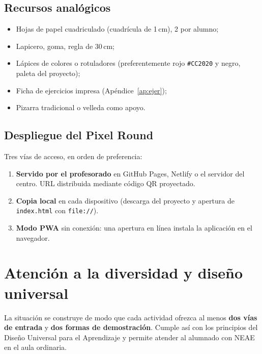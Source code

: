 \documentclass[12pt,a4paper]{scrartcl}
\newcommand{\acc}[1]{\textcolor{accent}{\textbf{#1}}}
\begin{document}
\subsection{Recursos analógicos}
\begin{itemize}[leftmargin=1.3em,itemsep=0.15em,topsep=0.3em]
  \item Hojas de papel cuadriculado (cuadrícula de 1\,cm), 2 por alumno;
  \item Lapicero, goma, regla de 30\,cm;
  \item Lápices de colores o rotuladores (preferentemente rojo \texttt{\#CC2020} y negro, paleta del proyecto);
  \item Ficha de ejercicios impresa (Apéndice~\ref{ap:ejer});
  \item Pizarra tradicional o velleda como apoyo.
\end{itemize}

\subsection{Despliegue del Pixel Round}

Tres vías de acceso, en orden de preferencia:

\begin{enumerate}[leftmargin=1.5em,itemsep=0.15em,topsep=0.3em]
  \item \textbf{Servido por el profesorado} en GitHub Pages, Netlify o el servidor del centro. URL distribuida mediante código QR proyectado.
  \item \textbf{Copia local} en cada dispositivo (descarga del proyecto y apertura de \texttt{index.html} con \texttt{file://}).
  \item \textbf{Modo PWA} sin conexión: una apertura en línea instala la aplicación en el navegador.
\end{enumerate}

\section{Atención a la diversidad y diseño universal}\label{sec:adapt}

La situación se construye de modo que cada actividad ofrezca al menos \acc{dos vías de entrada} y \acc{dos formas de demostración}. Cumple así con los principios del Diseño Universal para el Aprendizaje y permite atender al alumnado con NEAE en el aula ordinaria.
\end{document}
